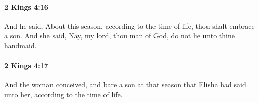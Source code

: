 		\paragraph{2 Kings 4:16} %
			\label{2KINGS-4-16}

			And he said, About this season, according to the time of life, thou shalt embrace a son. And she said, Nay, my lord, thou man of God, do not lie unto thine handmaid.


		\paragraph{2 Kings 4:17} %
			\label{2KINGS-4-17}

			And the woman conceived, and bare a son at that season that Elisha had said unto her, according to the time of life.


